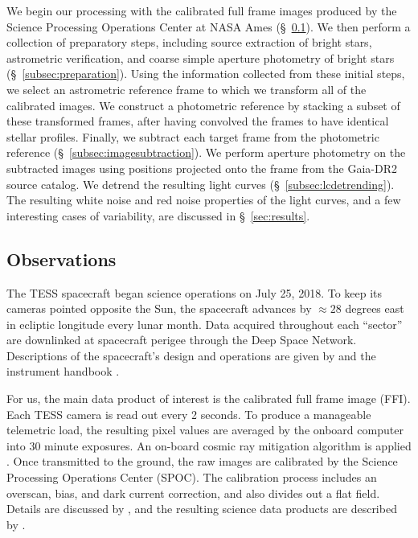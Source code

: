 \documentclass[12pt,twocolumn,tighten]{aastex62}
\begin{document}
We begin our processing with the calibrated full frame images produced
by the Science Processing Operations Center at NASA Ames
(\S~\ref{subsec:observations}).  We then perform a collection of
preparatory steps, including source extraction of bright stars,
astrometric verification, and coarse simple aperture photometry of
bright stars (\S~\ref{subsec:preparation}).  Using the information
collected from these initial steps, we select an astrometric reference
frame to which we transform all of the calibrated images.  We
construct a photometric reference by stacking a subset of these
transformed frames, after having convolved the frames to have
identical stellar profiles. Finally, we subtract each target frame
from the photometric reference (\S~\ref{subsec:imagesubtraction}).  We
perform aperture photometry on the subtracted images using positions
projected onto the frame from the Gaia-DR2 source catalog.  We detrend
the resulting light curves (\S~\ref{subsec:lcdetrending}).  The
resulting white noise and red noise properties of the light curves,
and a few interesting cases of variability, are discussed in
\S~\ref{sec:results}.


\subsection{Observations}
\label{subsec:observations}


The TESS spacecraft began science operations on July 25, 2018.  To
keep its cameras pointed opposite the Sun, the spacecraft advances by
$\approx$$28$ degrees east in ecliptic longitude every lunar month.
Data acquired throughout each ``sector'' are downlinked at spacecraft
perigee through the Deep Space Network.  Descriptions of the
spacecraft's design and operations are given by
\citet{ricker_transiting_2015} and the instrument handbook
\citep{vanderspek_2018}.

For us, the main data product of interest is the calibrated full frame
image (FFI).  Each TESS camera is read out every 2 seconds.  To
produce a manageable telemetric load, the resulting pixel values are
averaged by the onboard computer into 30 minute exposures. An on-board
cosmic ray mitigation algorithm is applied \citep[][\S
5.1]{vanderspek_2018}. Once transmitted to the ground, the raw images
are calibrated by the Science Processing Operations Center (SPOC).  The
calibration process includes an overscan, bias, and dark current
correction, and also divides out a flat field.  Details are discussed
by \citet{clarke_kepler_2017}, and the resulting science data products
are described by \citet{tess_data_product_description_2018}.
\end{document}
